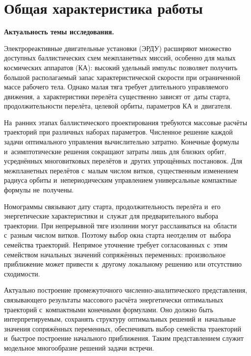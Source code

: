 \section*{Общая характеристика работы}

\newcommand{\synopsisheading}[2]{%
    \pdfbookmark[1]{#1}{#2}%
    \par\addvspace{3pt}\noindent\textbf{#1.}\enspace%
}

\synopsisheading{Актуальность темы исследования}{actuality}
Электрореактивные двигательные установки (ЭРДУ) расширяют множество доступных баллистических схем межпланетных миссий, особенно для малых космических аппаратов (КА): высокий удельный импульс позволяет получить большой располагаемый запас характеристической скорости при ограниченной массе рабочего тела. Однако малая тяга требует длительного управляемого движения, а~характеристики перелёта существенно зависят от~даты старта, продолжительности перелёта, целевой орбиты, параметров КА и~двигателя.

На~ранних этапах баллистического проектирования требуются массовые расчёты траекторий при различных наборах параметров. Численное решение каждой задачи оптимального управления вычислительно затратно. Конечные формулы и~асимптотические решения сокращают затраты лишь для близких орбит, усреднённых многовитковых перелётов и~других упрощённых постановок. Для межпланетных перелётов с~малым числом витков, существенным изменением радиуса орбиты и~непериодическим управлением универсальные компактные формулы не~получены.

Номограммы связывают дату старта, продолжительность перелёта и~его энергетические характеристики и~служат для предварительного выбора траектории. При непрерывной тяге изолинии могут расслаиваться на~области с~разным числом витков. Поэтому выбор окна старта неотделим от~выбора семейства траекторий. Непрямое уточнение требует согласованных с~этим семейством начальных значений сопряжённых переменных: произвольное приближение может привести к~другому локальному решению или отсутствию сходимости.

Актуально построение промежуточного численно-аналитического представления, связывающего результаты массового расчёта энергетически оптимальных траекторий с~компактными конечными формулами. Оно должно быть интерпретируемым, сохранять структуру оптимальных решений и~начальные значения сопряжённых переменных, обеспечивать выбор семейства траекторий и~быстрое построение начального приближения. Таким представлением служит модельное многообразие решений задачи встречи.

